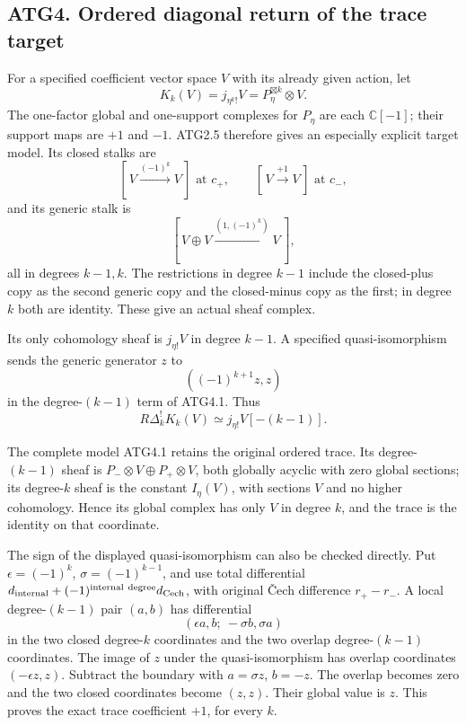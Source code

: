 \subsection{ATG4. Ordered diagonal return of the trace
target}\label{atg4.-ordered-diagonal-return-of-the-trace-target}

For a specified coefficient vector space \(V\) with its already given
action, let \[
K_k(V)=j_{\eta^k!}V=P_\eta^{\boxtimes k}\otimes V .
\] The one-factor global and one-support complexes for \(P_\eta\) are
each \(\mathbb C[-1]\); their support maps are \(+1\) and \(-1\). ATG2.5
therefore gives an especially explicit target model. Its closed stalks
are \[
[\,V\xrightarrow{(-1)^k}V\,]\text{ at }c_+,\qquad
[\,V\xrightarrow{+1}V\,]\text{ at }c_-,
\] and its generic stalk is \[
[\,V\oplus V\xrightarrow{(1,(-1)^k)}V\,],
\tag{ATG4.1}
\] all in degrees \(k-1,k\). The restrictions in degree \(k-1\) include
the closed-plus copy as the second generic copy and the closed-minus
copy as the first; in degree \(k\) both are identity. These give an
actual sheaf complex.

Its only cohomology sheaf is \(j_{\eta!}V\) in degree \(k-1\). A
specified quasi-isomorphism sends the generic generator \(z\) to \[
((-1)^{k+1}z,z)
\] in the degree-\((k-1)\) term of ATG4.1. Thus \[
\boxed{R\Delta_k^!K_k(V)\simeq j_{\eta!}V[-(k-1)].}
\tag{ATG4.2}
\]

The complete model ATG4.1 retains the original ordered trace. Its
degree-\((k-1)\) sheaf is \(P_-\otimes V\oplus P_+\otimes V\), both
globally acyclic with zero global sections; its degree-\(k\) sheaf is
the constant \(I_\eta(V)\), with sections \(V\) and no higher
cohomology. Hence its global complex has only \(V\) in degree \(k\), and
the trace is the identity on that coordinate.

The sign of the displayed quasi-isomorphism can also be checked
directly. Put \(\epsilon=(-1)^k\), \(\sigma=(-1)^{k-1}\), and use total
differential
\(d_{\rm internal}+(-1)^{\rm internal\ degree}d_{\rm Cech}\), with
original Čech difference \(r_+-r_-\). A local degree-\((k-1)\) pair
\((a,b)\) has differential \[
(\epsilon a,b;\ -\sigma b,\sigma a)
\] in the two closed degree-\(k\) coordinates and the two overlap
degree-\((k-1)\) coordinates. The image of \(z\) under the
quasi-isomorphism has overlap coordinates \((-\epsilon z,z)\). Subtract
the boundary with \(a=\sigma z\), \(b=-z\). The overlap becomes zero and
the two closed coordinates become \((z,z)\). Their global value is
\(z\). This proves the exact trace coefficient \(+1\), for every \(k\).

